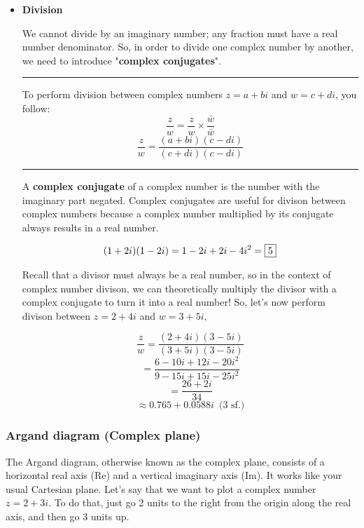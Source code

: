 \documentclass{article}
\begin{document}
\begin{itemize}
    \item \textbf{Division}
    
    We cannot divide by an imaginary number; any fraction must have a real number denominator. So, in order to divide one complex number by another, we need to introduce "\textbf{complex conjugates}".
    \begin{center}
    \rule{10cm}{0.4pt}

        
        To perform division between complex numbers $z=a+bi$ and $w=c+di$, you follow:
        $$\frac{z}{w}=\frac{z}{w} \times \frac{\bar{w}}{\bar{w}}$$
        $$\frac{z}{w}=\frac{(a+bi)(c-di)}{(c+di)(c-di)}$$
    
    \rule{10cm}{0.4pt}  
    \end{center}

    A \textbf{complex conjugate} of a complex number is the number with the imaginary part negated.
    Complex conjugates are useful for divison between
    complex numbers because a complex number multiplied
    by its conjugate always results in a real number. 
    
    $$(1+2i)(1-2i)=1-2i+2i-4i^2=\fbox{5}$$

    Recall that a divisor must always be a real number, so in the
    context of complex number divison, we can theoretically multiply
    the divisor with a complex conjugate to turn it into a real number! So, let's now
    perform divison between $z=2+4i$ and $w=3+5i$,

    $$\frac{z}{w}=\frac{(2+4i)(3-5i)}{(3+5i)(3-5i)}$$
    $$=\frac{6-10i+12i-20i^2}{9-15i+15i-25i^2}$$
    $$=\frac{26+2i}{34}$$
    $$\approx 0.765+0.0588i \phantom{1} \text{(3 sf.)}$$

\end{itemize}

\subsubsection{Argand diagram (Complex plane)}

The Argand diagram, otherwise known as the complex plane, consists of a horizontal real axis (Re) and a vertical imaginary axis (Im). It works like your usual Cartesian plane. Let's say that we want to plot a complex number $z=2+3i$. To do that, just go 2 units to the right from the origin along the real axis, and then go 3 units up.
\end{document}
